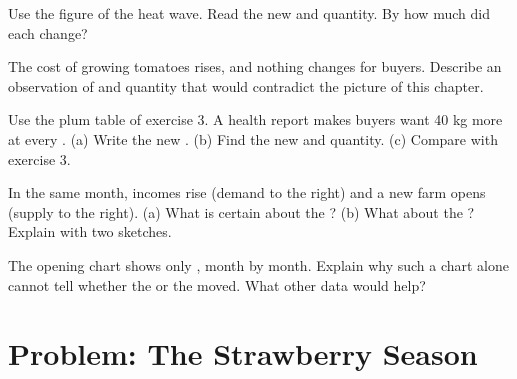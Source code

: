 \begin{exercise}[$\star\star$]\label{exo:g7:demand-and-supply-first-look:8}
Use the figure of the heat wave. Read the new  and quantity. By how much did
each change?
\end{exercise}

\begin{exercise}[$\star\star$]\label{exo:g7:demand-and-supply-first-look:9}
The cost of growing tomatoes rises, and nothing changes for buyers. Describe an observation of
 and quantity that would contradict the picture of this chapter.
\end{exercise}

\begin{exercise}[$\star\star\star$]\label{exo:g7:demand-and-supply-first-look:10}
Use the plum table of exercise 3. A health report makes buyers want 40 kg more at every .
(a) Write the new . (b) Find the new  and quantity. (c) Compare
with exercise 3.
\end{exercise}

\begin{exercise}[$\star\star\star$]\label{exo:g7:demand-and-supply-first-look:11}
In the same month, incomes rise (demand  to the right) and a new farm opens (supply
 to the right). (a) What is certain about the ? (b) What about the
? Explain with two sketches.
\end{exercise}

\begin{exercise}[$\star\star\star$]\label{exo:g7:demand-and-supply-first-look:12}
The opening chart shows only , month by month. Explain why such a chart alone cannot
tell whether the  or the  moved. What other data would help?
\end{exercise}

\section{Problem: The Strawberry Season}

